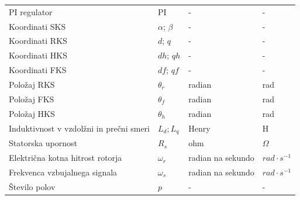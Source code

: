\documentclass[a4paper,twoside,openright,12pt,slovene]{book}
\begin{document}
\begin{center}
\begin{tabular}{*{4}{l}}
        PI regulator                                               & PI                                     & -                    & -                      \\                                                    
        Koordinati SKS                                             & $\alpha$; $\beta$                      & -                    & -                      \\
        Koordinati RKS                                             & $d$; $q$                               & -                    & -                      \\
        Koordinati HKS                                             & $dh$; $qh$                             & -                    & -                      \\
        Koordinati FKS                                             & $df$; $qf$                             & -                    & -                      \\
        Položaj RKS                                                & $\theta_{r}$                           & radian               & rad                    \\
        Položaj FKS                                                & $\theta_{f}$                           & radian               & rad                    \\
        Položaj HKS                                                & $\theta_{h}$                           & radian               & rad                    \\
        Induktivnost v vzdolžni in prečni smeri                    & $L_d; L_q$                             & Henry                & H                      \\
        Statorska upornost                                         & $R_s$                                  & ohm                  & $\Omega$               \\
        Električna kotna hitrost rotorja                           & $\omega_r$                             & radian na sekundo    & $rad \cdot s^{-1}$     \\
        Frekvenca vzbujalnega signala                              & $\omega_{s}$                           & radian na sekundo    & $rad \cdot s^{-1}$     \\
        Število polov                                              & $p$                                    & -                    & -                      \\

\end{tabular}
\end{center}
\end{document}

